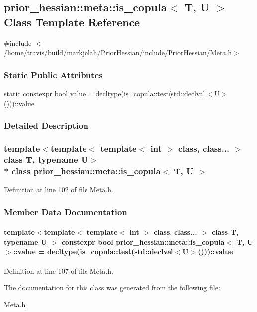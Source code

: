 \hypertarget{classprior__hessian_1_1meta_1_1is__copula}{}\subsection{prior\+\_\+hessian\+:\+:meta\+:\+:is\+\_\+copula$<$ T, U $>$ Class Template Reference}
\label{classprior__hessian_1_1meta_1_1is__copula}


{\ttfamily \#include $<$/home/travis/build/markjolah/\+Prior\+Hessian/include/\+Prior\+Hessian/\+Meta.\+h$>$}

\subsubsection*{Static Public Attributes}
\begin{DoxyCompactItemize}
\item 
static constexpr bool \hyperlink{classprior__hessian_1_1meta_1_1is__copula_ab24efa9841e050447aaaff81b7358bc7}{value} = decltype(is\+\_\+copula\+::test(std\+::declval$<$U$>$()))\+::value
\end{DoxyCompactItemize}


\subsubsection{Detailed Description}
\subsubsection*{template$<$template$<$ template$<$ int $>$ class, class... $>$ class T, typename U$>$\\*
class prior\+\_\+hessian\+::meta\+::is\+\_\+copula$<$ T, U $>$}



Definition at line 102 of file Meta.\+h.



\subsubsection{Member Data Documentation}
\paragraph[{\texorpdfstring{value}{value}}]{\setlength{\rightskip}{0pt plus 5cm}template$<$template$<$ template$<$ int $>$ class, class... $>$ class T, typename U $>$ constexpr bool {\bf prior\+\_\+hessian\+::meta\+::is\+\_\+copula}$<$ T, U $>$\+::value = decltype(is\+\_\+copula\+::test(std\+::declval$<$U$>$()))\+::value\hspace{0.3cm}{\ttfamily [static]}}\hypertarget{classprior__hessian_1_1meta_1_1is__copula_ab24efa9841e050447aaaff81b7358bc7}{}\label{classprior__hessian_1_1meta_1_1is__copula_ab24efa9841e050447aaaff81b7358bc7}


Definition at line 107 of file Meta.\+h.



The documentation for this class was generated from the following file\+:\begin{DoxyCompactItemize}
\item 
\hyperlink{Meta_8h}{Meta.\+h}\end{DoxyCompactItemize}
